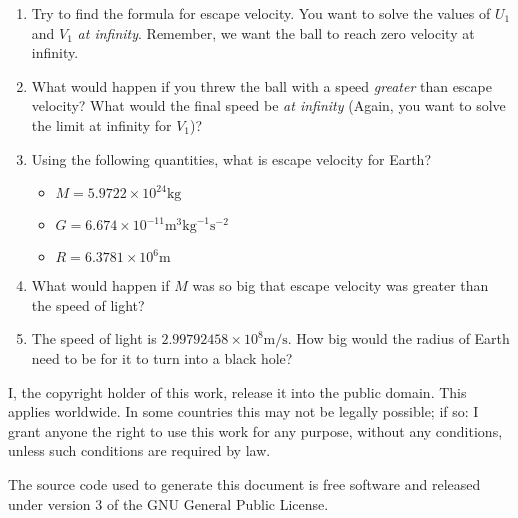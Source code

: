 \documentclass{article}
\begin{document}
    \begin{enumerate}
        \item Try to find the formula for escape velocity. You want to solve
              the values of $U_{1}$ and $V_{1}$ \textit{at infinity}. Remember,
              we want the ball to reach zero velocity at infinity.
        \item What would happen if you threw the ball with a speed
              \textit{greater} than escape velocity? What would the final speed
              be \textit{at infinity} (Again, you want to solve the limit at
              infinity for $V_{1}$)?
        \item Using the following quantities, what is escape velocity for Earth?
            \begin{itemize}
                \item $M=5.9722\times10^{24}\text{kg}$
                \item $G=6.674\times10^{-11}\text{m}^{3}\text{kg}^{-1}\text{s}^{-2}$
                \item $R=6.3781\times{10}^{6}\text{m}$
            \end{itemize}
        \item What would happen if $M$ was so big that escape velocity was
              greater than the speed of light?
        \item The speed of light is
              $2.99792458\times{10}^{8}\text{m}/\text{s}$. How big would
              the radius of Earth need to be for it to turn into a black hole?
    \end{enumerate}
    \newpage
    I, the copyright holder of this work, release it into the public domain.
    This applies worldwide. In some countries this may not be legally possible;
    if so: I grant anyone the right to use this work for any purpose, without
    any conditions, unless such conditions are required by law.
    \par\hfill\par
    The source code used to generate this document is free software and released
    under version 3 of the GNU General Public License.
\end{document}
